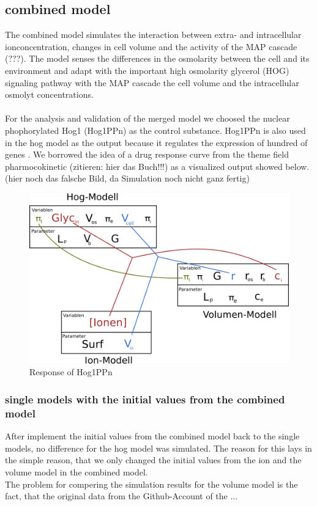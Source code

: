 \subsection{combined model}
The combined model simulates the interaction between extra- and intracellular ionconcentration, changes in cell volume and the activity of the MAP cascade (???). The model senses the differences in the osmolarity between the cell and its environment and adapt with the important high osmolarity glycerol (HOG) signaling pathway with the MAP cascade the cell volume and the intracellular osmolyt concentrations. \\\\
For the analysis and validation of the merged model we choosed the nuclear phophorylated Hog1 (Hog1PPn) as the control substance. Hog1PPn is also used in the hog model as the output because it regulates the expression of hundred of genes \cite{Zi_2010}. We borrowed the idea of a drug response curve from the theme field pharmocokinetic (zitieren: hier das Buch!!!) as a visualized output showed below.  \\
(hier noch das falsche Bild, da Simulation noch nicht ganz fertig)
\begin{figure}[h!]
	\begin{center}
		\begin{minipage}{0,8\textwidth}
			
			\includegraphics[width=\textwidth]{picture/model_intersections.png}
			\caption{Response of Hog1PPn} 
			\label{DrugResponseCurve} 
		\end{minipage}
	\end{center}
\end{figure}

\subsubsection{single models with the initial values from the combined model}
After implement the initial values from the combined model back to the single models, no difference for the hog model was simulated. The reason for this lays in the simple reason, that we only changed the initial values from the ion and the volume model in the combined model.\\
The problem for compering the simulation results for the volume model is the fact, that the original data from the Github-Account of the ...

\newpage
